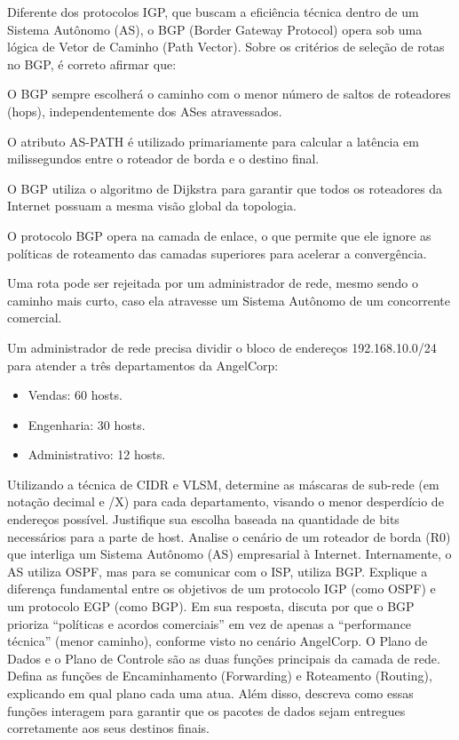 \documentclass[11pt, addpoints]{modelo/prova2}
\begin{document}
\question[0.5] Diferente dos protocolos IGP, que buscam a eficiência técnica dentro de um Sistema Autônomo (AS), o BGP (Border Gateway Protocol) opera sob uma lógica de Vetor de Caminho (Path Vector). Sobre os critérios de seleção de rotas no BGP, é correto afirmar que:
    \begin{choices}
        \item O BGP sempre escolherá o caminho com o menor número de saltos de roteadores (hops), independentemente dos ASes atravessados.
        \item O atributo AS-PATH é utilizado primariamente para calcular a latência em milissegundos entre o roteador de borda e o destino final.        
        \item O BGP utiliza o algoritmo de Dijkstra para garantir que todos os roteadores da Internet possuam a mesma visão global da topologia.
        \item O protocolo BGP opera na camada de enlace, o que permite que ele ignore as políticas de roteamento das camadas superiores para acelerar a convergência.
        \item Uma rota pode ser rejeitada por um administrador de rede, mesmo sendo o caminho mais curto, caso ela atravesse um Sistema Autônomo de um concorrente comercial.
    \end{choices} 
\question[2] Um administrador de rede precisa dividir o bloco de endereços 192.168.10.0/24 para atender a três departamentos da AngelCorp:
\begin{itemize}
    \item Vendas: 60 hosts.
    \item Engenharia: 30 hosts.
    \item Administrativo: 12 hosts.
\end{itemize}
Utilizando a técnica de CIDR e VLSM, determine as máscaras de sub-rede (em notação decimal e /X) para cada departamento, visando o menor desperdício de endereços possível. Justifique sua escolha baseada na quantidade de bits necessários para a parte de host.
\question[2] Analise o cenário de um roteador de borda (R0) que interliga um Sistema Autônomo (AS) empresarial à Internet. Internamente, o AS utiliza OSPF, mas para se comunicar com o ISP, utiliza BGP. Explique a diferença fundamental entre os objetivos de um protocolo IGP (como OSPF) e um protocolo EGP (como BGP). Em sua resposta, discuta por que o BGP prioriza ``políticas e acordos comerciais'' em vez de apenas a ``performance técnica'' (menor caminho), conforme visto no cenário AngelCorp.
\question[2] O Plano de Dados e o Plano de Controle são as duas funções principais da camada de rede. Defina as funções de Encaminhamento (Forwarding) e Roteamento (Routing), explicando em qual plano cada uma atua. Além disso, descreva como essas funções interagem para garantir que os pacotes de dados sejam entregues corretamente aos seus destinos finais.

\gabarito
\end{document}
